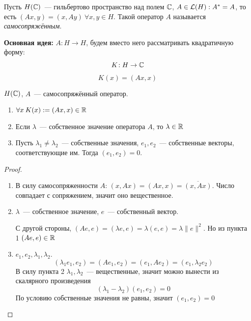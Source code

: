 \begin{definition}
Пусть $H(\mathbb{C})$~--- гильбертово пространство над полем $\mathbb{C}$,
$A \in \mathcal{L}(H) : A^* = A$, то есть $(Ax, y) = (x, Ay)\ \forall x, y \in H$.
Такой оператор $A$ называется \textit{самосопряжённым}.
\end{definition}

\noindent\textbf{Основная идея:} $A: H \to H$, будем вместо него рассматривать квадратичную форму:
\[ K\!: H \to \mathbb{C} \]
\[K(x)=(Ax, x)\]

\begin{theorem}[11.1]\label{11.1}
$H(\mathbb{C})$, $A$~--- самосопряжённый оператор.
\begin{enumerate}
    \item $\forall x\: K(x) := (Ax, x) \in \mathbb{R}$
    \item Если $\lambda$~--- собственное значение оператора $A$, 
    то $\lambda \in \mathbb{R}$
    \item Пусть $\lambda_1 \neq \lambda_2$~--- собственные значения, 
    $e_1, e_2$~--- собственные векторы, соответствующие им. 
    Тогда $(e_1, e_2) = 0$.
\end{enumerate}
\end{theorem}

\begin{proof}
    \begin{enumerate}
        \item В силу самосопряженности $A$: $(x, Ax)=(Ax, x)=\overline{(x, Ax)}$. Число совпадает с сопряжением, значит оно вещественное.
        
        \item $\lambda$~--- собственное значение, $e$~--- собственный вектор.
        
        С другой стороны, 
        $(Ae, e) = (\lambda e, e) = \lambda (e, e)=\lambda \|e\|^2$. Но из пункта 1
        $(Ae, e) \in \mathbb{R}$
    
        \item $e_1, e_2, \lambda_1, \lambda_2$. 
        \[ (\lambda_1 e_1, e_2) = (Ae_1, e_2)=(e_1, Ae_2) = (e_1, \lambda_2 e_2)\]
        В силу пункта 2 $\lambda_1, \lambda_2$~--- вещественные, значит можно вынести из скалярного произведения
        \[ (\lambda_1 - \lambda_2) (e_1, e_2) = 0\]
        По условию собственные значения не равны, значит $(e_1, e_2)=0$
    \end{enumerate}
\end{proof}

